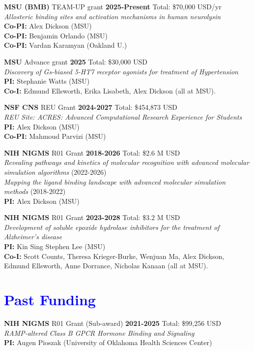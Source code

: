 \documentclass[margin,line]{res}
\begin{document}
\begin{resume}
{\bf MSU (BMB)} TEAM-UP grant \hfill {\bf 2025-Present} Total: \$70,000 USD/yr \\
\emph{Allosteric binding sites and activation mechanisms in human neurolysin} \\
     {\bf Co-PI:} Alex Dickson (MSU)\\
     {\bf Co-PI:} Benjamin Orlando (MSU)\\
     {\bf Co-PI:} Vardan Karamyan (Oakland U.)

{\bf MSU} Advance grant \hfill {\bf 2025} Total: \$30,000 USD \\
\emph{Discovery of Gs-biased 5-HT7 receptor agonists for treatment of Hypertension} \\
     {\bf PI:} Stephanie Watts (MSU)\\
     {\bf Co-I:} Edmund Ellsworth, Erika Lisabeth, Alex Dickson (all at MSU).

{\bf NSF CNS} REU Grant \hfill {\bf 2024-2027} Total: \$454,873 USD \\
\emph{REU Site: ACRES: Advanced Computational Research Experience for Students}\\
     {\bf PI:} Alex Dickson (MSU) \\
     {\bf Co-PI:} Mahmoud Parvizi (MSU) 

{\bf NIH NIGMS} R01 Grant \hfill {\bf 2018-2026} Total: \$2.6 M USD \\
\emph{Revealing pathways and kinetics of molecular recognition with advanced molecular simulation algorithms} (2022-2026)\\
\emph{Mapping the ligand binding landscape with advanced molecular simulation methods} (2018-2022)\\
{\bf PI:} Alex Dickson (MSU)

{\bf NIH NIGMS} R01 Grant \hfill {\bf 2023-2028} Total: \$3.2 M USD \\
\emph{Development of soluble epoxide hydrolase inhibitors for the treatment of Alzheimer's disease} \\
     {\bf PI:} Kin Sing Stephen Lee (MSU) \\
     {\bf Co-I:} Scott Counts, Theresa Krieger-Burke, Wenjuan Ma, Alex Dickson, Edmund Ellsworth, Anne Dorrance, Nicholas Kanaan (all at MSU).

\section{\sc \textcolor{blue}{Past Funding} }

{\bf NIH NIGMS} R01 Grant (Sub-award) \hfill {\bf 2021-2025} Total: \$99,256 USD \\
\emph{RAMP‐altered Class B GPCR Hormone Binding and Signaling}\\
{\bf PI:} Augen Pioszak (University of Oklahoma Health Sciences Center)


\end{resume}
\end{document}
